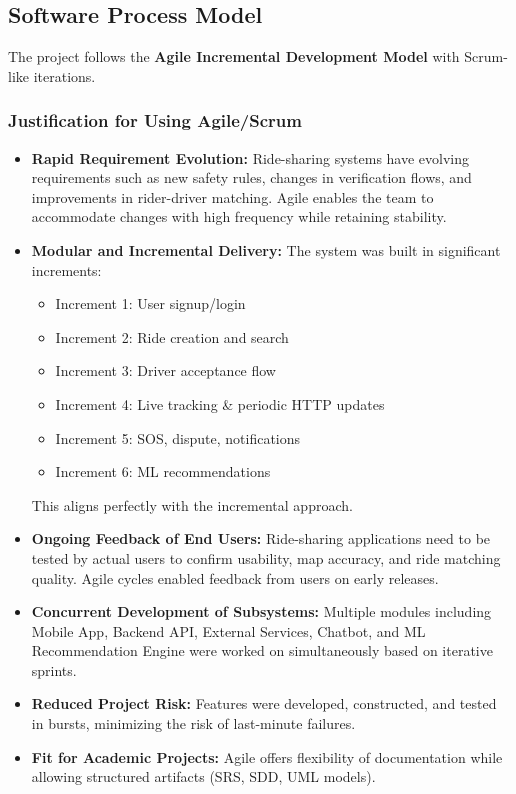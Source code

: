 \subsection{Software Process Model}

The project follows the \textbf{Agile Incremental Development Model} with Scrum-like iterations.

\subsubsection{Justification for Using Agile/Scrum}

\begin{itemize}
    \item \textbf{Rapid Requirement Evolution:} Ride-sharing systems have evolving requirements such as new safety rules, changes in verification flows, and improvements in rider-driver matching. Agile enables the team to accommodate changes with high frequency while retaining stability.
    
    \item \textbf{Modular and Incremental Delivery:} The system was built in significant increments:
    \begin{itemize}
        \item Increment 1: User signup/login
        \item Increment 2: Ride creation and search
        \item Increment 3: Driver acceptance flow
        \item Increment 4: Live tracking \& periodic HTTP updates
        \item Increment 5: SOS, dispute, notifications
        \item Increment 6: ML recommendations
    \end{itemize}
    This aligns perfectly with the incremental approach.
    
    \item \textbf{Ongoing Feedback of End Users:} Ride-sharing applications need to be tested by actual users to confirm usability, map accuracy, and ride matching quality. Agile cycles enabled feedback from users on early releases.
    
    \item \textbf{Concurrent Development of Subsystems:} Multiple modules including Mobile App, Backend API, External Services, Chatbot, and ML Recommendation Engine were worked on simultaneously based on iterative sprints.
    
    \item \textbf{Reduced Project Risk:} Features were developed, constructed, and tested in bursts, minimizing the risk of last-minute failures.
    
    \item \textbf{Fit for Academic Projects:} Agile offers flexibility of documentation while allowing structured artifacts (SRS, SDD, UML models).
\end{itemize}

